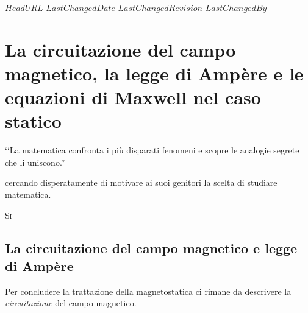\svnidlong
{$HeadURL$}
{$LastChangedDate$}
{$LastChangedRevision$}
{$LastChangedBy$}
\chapter{La circuitazione del campo magnetico, la legge di Ampère e le equazioni di Maxwell nel caso statico} 

\begin{introduction}
‘‘La matematica confronta i più disparati fenomeni e scopre le analogie segrete che li uniscono.''
\begin{flushright}
	 cercando disperatamente di motivare ai suoi genitori la scelta di studiare matematica. %
\end{flushright}
\end{introduction}
\lettrine[findent=1pt, nindent=0pt]{S}{i} %

\section{La circuitazione del campo magnetico e legge di Ampère}
Per concludere la trattazione della magnetostatica ci rimane da descrivere la \textit{circuitazione} del campo magnetico.
